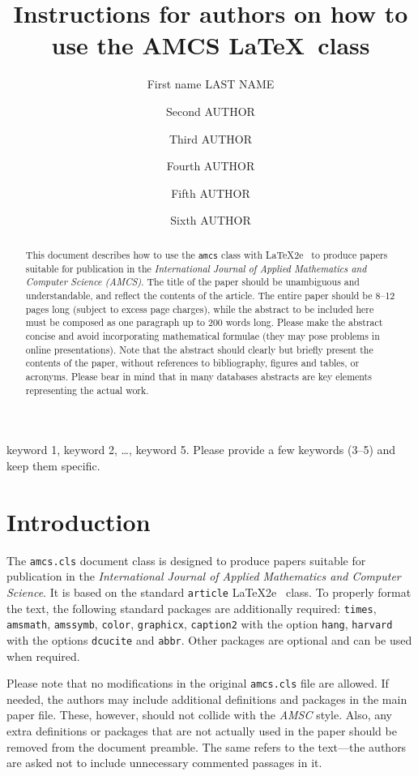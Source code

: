\documentclass{amcs}
\title[Instructions for authors on ...]{Instructions for authors on how to use the AMCS \LaTeX~class}
\author[ad1][ad2]{First name LAST NAME}
\author[ad1][]{Second AUTHOR}
\author[ad1][ad2]{Third AUTHOR}
\author[ad2][]{Fourth AUTHOR}
\author[ad1][ad2]{Fifth AUTHOR}
\author[ad2][]{Sixth AUTHOR}
\begin{document}
\begin{abstract}
This document describes how to use the \verb+amcs+ class with \LaTeX2e ~to produce papers suitable for publication in the \emph{International Journal of Applied Mathematics and Computer Science (AMCS)}. The title of the paper should be unambiguous and understandable, and reflect the contents of the article. The entire paper should be 8--12 pages long (subject to excess page charges), while the abstract to be included here must be composed as one paragraph up to 200 words long. Please make the abstract concise and avoid incorporating mathematical formulae (they may pose problems in online presentations). Note that the abstract should clearly but briefly present the contents of the paper, without references to bibliography, figures and tables, or acronyms. Please bear in mind that in many databases abstracts are key elements representing the actual work.
\end{abstract}

\begin{keywords}
keyword 1, keyword 2, \dots, keyword 5. Please provide a few keywords (3--5) and keep them specific.
\end{keywords}
\maketitle

\section{Introduction}
The \verb+amcs.cls+ document class is designed to produce papers suitable for publication in the \emph{International Journal of Applied Mathematics and Computer Science}. It is based on the standard \verb+article+ \LaTeX2e ~class. To properly format the text, the following standard packages are additionally required: \verb+times+, \verb+amsmath+, \verb+amssymb+, \verb+color+, \verb+graphicx+, \verb+caption2+ with the option \verb+hang+, \verb+harvard+ with the options \verb+dcucite+ and \verb+abbr+. Other packages are optional and can be used when required.

Please note that no modifications in the original \verb+amcs.cls+ file are allowed. If needed, the authors may include additional definitions and packages in the main paper file. These, however, should not collide with the \emph{AMSC} style. Also, any extra definitions or packages that are not actually used in the paper should be removed from the document preamble. The same refers to the text---the authors are asked not to include unnecessary commented passages in it.
\end{document}

